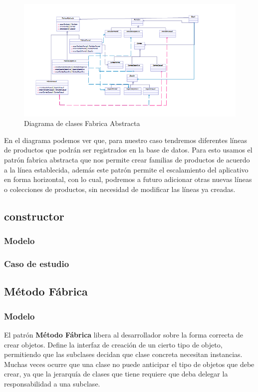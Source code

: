 	\begin{figure}[th!]
		\centering
		\includegraphics[width=1\linewidth]{arquitectura/imagenes/DiagramaFabricaAbstracta}
		\caption{Diagrama de clases Fabrica Abstracta}
	\end{figure}
	
	
	
	En el diagrama podemos ver que, para nuestro caso tendremos diferentes líneas de productos que podrán ser registrados en la base de datos. Para esto usamos el patrón fabrica abstracta que nos permite crear familias de productos de acuerdo a la línea establecida, además este patrón permite el escalamiento del aplicativo en forma horizontal, con lo cual, podremos a futuro adicionar otras nuevas líneas o colecciones de productos, sin necesidad de modificar las líneas ya creadas.
	
	
\newpage


\subsection{constructor}
\subsubsection{Modelo}
\newpage
\subsubsection{Caso de estudio}
\newpage

\subsection{Método Fábrica}
\subsubsection{Modelo}
El patrón \textbf{Método Fábrica} libera al desarrollador sobre la forma correcta de crear objetos. Define la interfaz de creación de un cierto tipo de objeto, permitiendo que las subclases decidan que clase concreta necesitan instancias. Muchas veces ocurre que una clase no puede anticipar el tipo de objetos que debe crear, ya que la jerarquía de clases que tiene requiere que deba delegar la responsabilidad a una subclase. 

